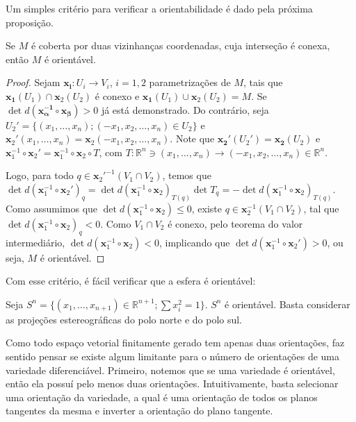 Um simples critério para verificar a orientabilidade é dado pela próxima proposição.
\begin{proposition}
    \label{loc:exemplos_de_orientabilidade.proposição_1}
    Se $M$ é coberta por duas vizinhanças coordenadas, cuja interseção é conexa, então $M$ é orientável.
    \begin{proof}

        Sejam $\mathbf{x_{i}}:U_{i}\to V_{i}$, $i=1, 2$ parametrizações de $M$, tais que $\mathbf{x_{1}}(U_{1})\cap \mathbf{x}_{2}(U_{2})$ é conexo e $\mathbf{x_{1}}(U_{1})\cup \mathbf{x}_{2}(U_{2})=M$.
        Se $\det d(\mathbf{x_{\alpha}^{-1} \circ x_{\beta}})>0$ já está demonstrado. Do contrário, seja $U_{2}'=\{ (x_{1}, \dots, x_{n});(-x_{1}, x_{2}, \dots, x_{n})\in U_{2} \}$ e $\mathbf{x}_{2}'(x_{1}, \dots, x_{n})=\mathbf{x}_{2}(-x_{1}, x_{2}, \dots, x_{n})$.
        Note que $\mathbf{x_{2}'}(U_{2}')=\mathbf{x_{2}}(U_{2})$ e $\mathbf{x}_{1}^{-1} \circ \mathbf{x}_{2}'=\mathbf{x}_{1}^{-1}\circ \mathbf{x}_{2} \circ T$, com $T:\mathbb{R}^{n} \ni (x_{1}, \dots, x_{n}) \to (-x_{1}, x_{2}, \dots, x_{n}) \in \mathbb{R}^{n}$.

        Logo, para todo $q \in \mathbf{x}_{2}'^{-1}(V_{1}\cap V_{2})$, temos que $\det d(\mathbf{x}_{1}^{-1} \circ\mathbf{x}_{2}')_{q}=\det d(\mathbf{x}_{1}^{-1}\circ\mathbf{x}_{2})_{T(q)} \det T_{q}=-\det d(\mathbf{x}_{1}^{-1}\circ\mathbf{x}_{2})_{T(q)}$.
        Como assumimos que $\det d(\mathbf{x}_{1}^{-1}\circ\mathbf{x}_{2}) \leq0$, existe $q \in \mathbf{x}_{2}^{-1}(V_{1} \cap V_{2})$, tal que $\det d(\mathbf{x}_{1}^{-1}\circ\mathbf{x}_{2})_{q}<0$. Como $V_{1}\cap V_{2}$ é conexo, pelo teorema do valor intermediário, $\det d(\mathbf{x}_{1}^{-1}\circ\mathbf{x}_{2})<0$, implicando que $\det d(\mathbf{x}_{1}^{-1}\circ\mathbf{x}_{2}')>0$, ou seja, $M$ é orientável.
    \end{proof}
\end{proposition}
Com esse critério, é fácil verificar que a esfera é orientável:
\begin{proposition}
    \label{loc:exemplos_de_orientabilidade.esfera_é_orientável.}
    Seja $S^{n}=\{ \left( x_{1}, \dots, x_{n+1}\right)\in \mathbb{R}^{n+1};\sum x_{i}^{2}=1 \}$. $S^{n}$ é orientável. Basta considerar as projeções estereográficas do polo norte e do polo sul.
\end{proposition}
Como todo espaço vetorial finitamente gerado tem apenas duas orientações, faz sentido pensar se existe algum limitante para o número de orientações de uma variedade diferenciável. Primeiro, notemos que se uma variedade é orientável, então ela possuí pelo menos duas orientações. Intuitivamente, basta selecionar uma orientação da variedade, a qual é uma orientação de todos os planos tangentes da mesma e inverter a orientação do plano tangente.

